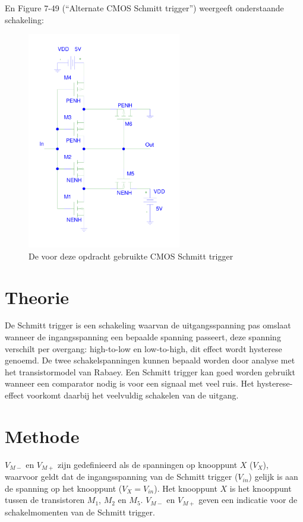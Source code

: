 \documentclass{scrartcl}  %
\begin{document}
En Figure 7-49 (``Alternate CMOS Schmitt trigger'') weergeeft onderstaande schakeling:
\begin{figure}[H]
\centering
	\includegraphics[width=0.6\textwidth]{resource/schmitt-rc.pdf}
	\caption{De voor deze opdracht gebruikte CMOS Schmitt trigger}
	\label{fig:schmitt-schem}
\end{figure}

\section{Theorie}
\label{sec:trig-theorie}
De Schmitt trigger is een schakeling waarvan de uitgangsspanning pas omslaat wanneer de ingangsspanning een bepaalde spanning passeert, deze spanning verschilt per overgang: high-to-low en low-to-high, dit effect wordt hysterese genoemd. De twee schakelspanningen kunnen bepaald worden door analyse met het transistormodel van Rabaey. Een Schmitt trigger kan goed worden gebruikt wanneer een comparator nodig is voor een signaal met veel ruis. Het hysterese-effect voorkomt daarbij het veelvuldig schakelen van de uitgang.

\section{Methode}
\label{sec:trig-methode}
$V_{M-}$ en $V_{M+}$ zijn gedefinieerd als de spanningen op knooppunt $X$ ($V_{X}$), waarvoor geldt dat de ingangsspanning van de Schmitt trigger ($V_{in}$) gelijk is aan de spanning op het knooppunt ($V_{X} = V_{in}$).
Het knooppunt $X$ is het knooppunt tussen de transistoren $M_{1}$, $M_{2}$ en $M_{5}$. $V_{M-}$ en $V_{M+}$ geven een indicatie voor de schakelmomenten van de Schmitt trigger.
\end{document}
